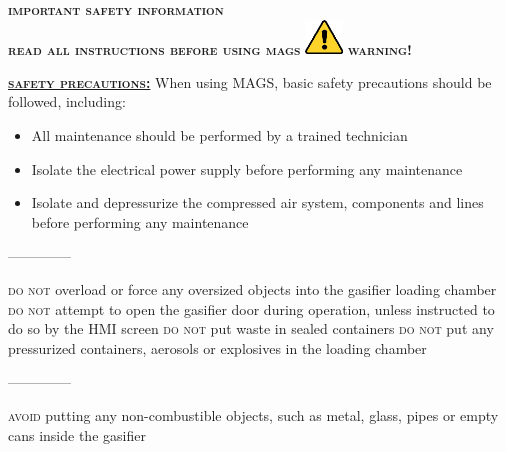 \begin{center}
    \textcolor{terragon}{
    {\Large 
    \textsc{\textbf{important safety information}}\\
    \textsc{\textbf{read all instructions before using mags}}
    }}
    \wl
    \includegraphics[width=1cm]{pictures/caution_sign.png} \textcolor{terragon}{\Huge \textsc{\textbf{warning!}}}\\
\end{center}
\vspace{1cm}
\textcolor{terragon}{
{\large
\textsc{\textbf{\underline{safety precautions:}}}
\wl
When using MAGS, basic safety precautions should be followed, including:
\begin{itemize}
    \item All maintenance should be performed by a trained technician
    \item Isolate the electrical power supply before performing any maintenance
    \item Isolate and depressurize the compressed air system, components and lines before performing any maintenance
\end{itemize}
}}
\begin{center}
    \textcolor{terragon}{--------------}
\end{center}
\textcolor{terragon}{
{\large
\textsc{do not} overload or force any oversized objects into the gasifier loading chamber
\wl
\textsc{do not} attempt to open the gasifier door during operation, unless instructed to do so by the HMI screen
\wl
\textsc{do not} put waste in sealed containers
\wl
\textsc{do not} put any pressurized containers, aerosols or explosives in the loading chamber
}}
\begin{center}
    \textcolor{terragon}{--------------}
\end{center}
\textcolor{terragon}{
{\large
\textsc{avoid} putting any non-combustible objects, such as metal, glass, pipes or empty cans inside the gasifier
}}